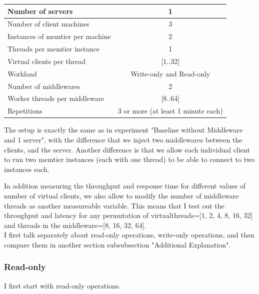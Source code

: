 \documentclass[11pt,a4paper]{article}
\begin{document}
\begin{center}
	\scriptsize{
		\begin{tabular}{|l|c|}
			\hline Number of servers                & 1                        \\ 
			\hline Number of client machines        & 3                        \\ 
			\hline Instances of memtier per machine & 2                        \\ 
			\hline Threads per memtier instance     & 1                        \\
			\hline Virtual clients per thread       & [1..32]                  \\ 
			\hline Workload                         & Write-only and Read-only \\
			\hline Number of middlewares            & 2                        \\
			\hline Worker threads per middleware    & [8..64]                  \\
			\hline Repetitions                      & 3 or more (at least 1 minute each)                \\ 
			\hline 
		\end{tabular}
	} 
\end{center}

The setup is exactly the same as in experiment "Baseline without Middleware and 1 server", with the difference that we inject two middlewares between the clients, and the server.
Another difference is that we allow each individual client to run two memtier instances (each with one thread) to be able to connect to two instances each.

In addition measuring the throughput and response time for different values of number of virtual clients, we also allow to modify the number of middleware threads as another measureable variable.
This means that I test out the throughput and latency for any permutation of
virtualthreads=[1, 2, 4, 8, 16, 32] and threads in the middleware=[8, 16, 32, 64].\\

I first talk separately about read-only operations, write-only operations, and then compare them in another section subsubsection "Additional Explanation".

\subsubsection{Read-only}
I first start with read-only operations.
\end{document}
